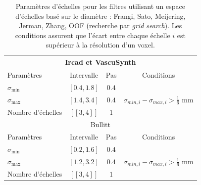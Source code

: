\begin{table}[H]
  \caption{Paramètres d'échelles pour les filtres utilisant un espace d'échelles basé sur le diamètre :  Frangi, Sato, Meijering, Jerman, Zhang, OOF (recherche par \textit{grid search}). Les conditions  assurent que l'écart entre chaque échelle $i$ est supérieur à la résolution d'un voxel.}
  \label{tab:SS_interval}
  \begin{center}
    \begin{tabular}{  l  c  c  c }
      \hline
      \multicolumn{4}{c}{ Ircad et VascuSynth }\\
      \hline
      Paramètres & Intervalle & Pas & Conditions \\
      \hline
      $\sigma_{\min}$ & $[0.4,1.8]$ & $0.4$ & \\
      $\sigma_{\max}$ & $[1.4,3.4]$  & $0.4$ & $\sigma_{min,i} - \sigma_{max,i} > \frac{1}{6}$ mm \\ 
      Nombre d'échelles & $[\![3,4]\!]$ & $1$ & \\
      \hline
      \hline
      \multicolumn{4}{c}{ Bullitt }\\
      \hline
      Paramètres & Intervalle & Pas & Conditions \\
      \hline
      $\sigma_{\min}$ & $[0.2,1.6]$ & $0.4$ & \\
      $\sigma_{\max}$ & $[1.2,3.2]$  & $0.4$ & $\sigma_{min,i} - \sigma_{max,i} > \frac{1}{6}$ mm \\ 
      Nombre d'échelles & $[\![3,4]\!]$ & $1$ & \\
      \hline
    \end{tabular}
  \end{center}
\end{table}

